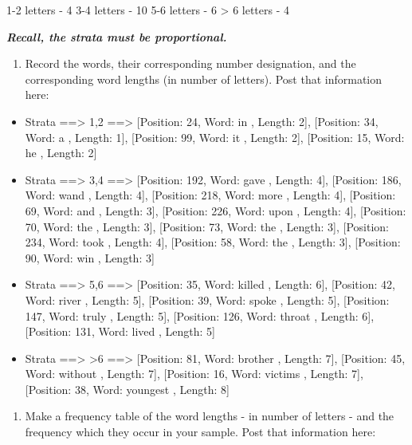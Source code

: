 \documentclass[letterpaper]{article}
\def\tightlist{}
\begin{document}
1-2 letters - 4
3-4 letters - 10
5-6 letters - 6
\textgreater{} 6 letters - 4

\textbf{\emph{Recall, the strata must be proportional.}}

\begin{enumerate}
\def\labelenumi{\alph{enumi}.}
\tightlist
\item
  Record the words, their corresponding number designation, and the corresponding word lengths (in number of letters). Post that information here:
\end{enumerate}

\begin{itemize}
\tightlist
\item
  Strata ==\textgreater{} 1,2 ==\textgreater{}
  {[}Position: 24, Word: in , Length: 2{]},
  {[}Position: 34, Word: a , Length: 1{]},
  {[}Position: 99, Word: it , Length: 2{]},
  {[}Position: 15, Word: he , Length: 2{]}
\item
  Strata ==\textgreater{} 3,4 ==\textgreater{}
  {[}Position: 192, Word: gave , Length: 4{]},
  {[}Position: 186, Word: wand , Length: 4{]},
  {[}Position: 218, Word: more , Length: 4{]},
  {[}Position: 69, Word: and , Length: 3{]},
  {[}Position: 226, Word: upon , Length: 4{]},
  {[}Position: 70, Word: the , Length: 3{]},
  {[}Position: 73, Word: the , Length: 3{]},
  {[}Position: 234, Word: took , Length: 4{]},
  {[}Position: 58, Word: the , Length: 3{]},
  {[}Position: 90, Word: win , Length: 3{]}
\item
  Strata ==\textgreater{} 5,6 ==\textgreater{}
  {[}Position: 35, Word: killed , Length: 6{]},
  {[}Position: 42, Word: river , Length: 5{]},
  {[}Position: 39, Word: spoke , Length: 5{]},
  {[}Position: 147, Word: truly , Length: 5{]},
  {[}Position: 126, Word: throat , Length: 6{]},
  {[}Position: 131, Word: lived , Length: 5{]}
\item
  Strata ==\textgreater{} \textgreater6 ==\textgreater{}
  {[}Position: 81, Word: brother , Length: 7{]},
  {[}Position: 45, Word: without , Length: 7{]},
  {[}Position: 16, Word: victims , Length: 7{]},
  {[}Position: 38, Word: youngest , Length: 8{]}
\end{itemize}

\begin{enumerate}
\def\labelenumi{\alph{enumi}.}
\setcounter{enumi}{1}
\tightlist
\item
  Make a frequency table of the word lengths - in number of letters - and the frequency which they occur in your sample. Post that information here:
\end{enumerate}
\end{document}
